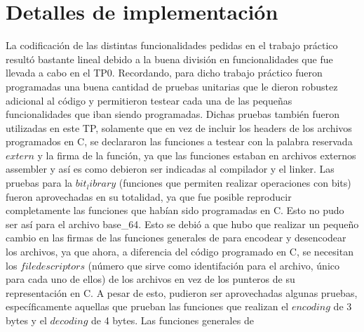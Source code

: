 \documentclass[11pt]{article}
\begin{document}
    \section*{Detalles de implementación}
        La codificación de las distintas funcionalidades pedidas en el trabajo práctico resultó bastante lineal debido a la buena división en funcionalidades que fue llevada a cabo en el TP0. 
        Recordando, para dicho trabajo práctico fueron programadas una buena cantidad de pruebas unitarias que le dieron robustez adicional al código y permitieron testear cada una de las pequeñas funcionalidades que iban siendo programadas. Dichas pruebas también fueron utilizadas en este TP, solamente que en vez de incluir los headers de los archivos programados en C, se declararon las funciones a testear con la palabra reservada $extern$ y la firma de la función, ya que las funciones estaban en archivos externos assembler y así es como debieron ser indicadas al compilador y el linker. 
        Las pruebas para la $bit_library$ (funciones que permiten realizar operaciones con bits) fueron aprovechadas en su totalidad, ya que fue posible reproducir completamente las funciones que habían sido programadas en C. Esto no pudo ser así para el archivo base_64. Esto se debió a que hubo que realizar un pequeño cambio en las firmas de las funciones generales de para encodear y desencodear los archivos, ya que ahora, a diferencia del código programado en C, se necesitan los $file descriptors$ (número que sirve como identifación para el archivo, único para cada uno de ellos) de los archivos en vez de los punteros de su representación en C. A pesar de esto, pudieron ser aprovechadas algunas pruebas, específicamente aquellas que prueban las funciones que realizan el $encoding$ de 3 bytes y el $decoding$ de 4 bytes. Las funciones generales de 
\end{document}
